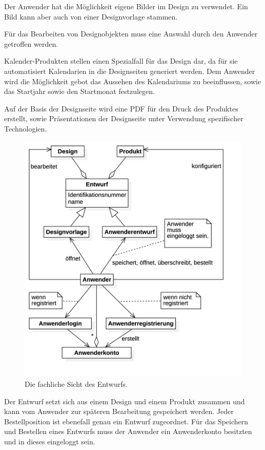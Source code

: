 Der Anwender hat die Möglichkeit eigene Bilder im Design zu verwendet. Ein Bild kann aber auch von einer Designvorlage stammen. 

Für das Bearbeiten von Designobjekten muss eine Auswahl durch den Anwender getroffen werden. 

Kalender-Produkten stellen einen Spezialfall für das Design dar, da für sie automatisiert Kalendarien in die Designseiten generiert werden.  Dem Anwender wird die Möglichkeit gebot das Aussehen des Kalendariums zu beeinflussen, sowie das Startjahr sowie den Startmonat festzulegen.

Auf der Basis der Designseite wird eine PDF für den Druck des Produktes erstellt, sowie Präsentationen der Designseite unter Verwendung spezifischer Technologien.

\begin{figure}[H]
    \centering
    \caption{Die fachliche Sicht des Entwurfs.}
    \label{fig:dm-entwurf}
    \includegraphics[width=.5\textwidth]{diagrams/Soll-Architektur/DM-Anwenderstruktur.png}
\end{figure}

Der Entwurf setzt sich aus einem Design und einem Produkt zusammen und kann vom Anwender zur späteren Bearbeitung gespeichert werden. Jeder Bestellposition ist ebenefall genau ein Entwurf zugeordnet. Für das Speichern und Bestellen eines Entwurfs muss der Anwender ein Anwenderkonto besitzten und in dieses eingeloggt sein.

